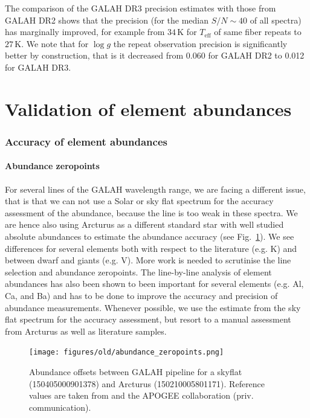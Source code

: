 \documentclass[fleqn,usenatbib,useAMS]{mnras}
\begin{document}
The comparison of the GALAH DR3 precision estimates with those from GALAH DR2 \citep{Buder2018} shows that the precision (for the median $S/N \sim 40$ of all spectra) has marginally improved, for example from $34\,\mathrm{K}$ for $T_\text{eff}$ of same fiber repeats to $27\,\mathrm{K}$. We note that for $\log g$ the repeat observation precision is significantly better by construction, that is it decreased from 0.060 for GALAH DR2 to 0.012 for GALAH DR3.

\section{Validation of element abundances} \label{sec:validation_ab}

\subsubsection{Accuracy of element abundances}

\paragraph*{Abundance zeropoints}

For several lines of the GALAH wavelength range, we are facing a different issue, that is that we can not use a Solar or sky flat spectrum for the accuracy assessment of the abundance, because the line is too weak in these spectra. We are hence also using Arcturus as a different standard star with well studied absolute abundances to estimate the abundance accuracy (see Fig.~\ref{fig:abundance_zeropoints}). We see differences for several elements both with respect to the literature (e.g. K) and between dwarf and giants (e.g. V). More work is needed to scrutinise the line selection and abundance zeropoints. The line-by-line analysis of element abundances has also been shown to been important for several elements (e.g. Al, Ca, and Ba) and has to be done to improve the accuracy and precision of abundance measurements. Whenever possible, we use the estimate from the sky flat spectrum for the accuracy assessment, but resort to a manual assessment from Arcturus as well as literature samples.

\begin{figure}
\centering
\texttt{[image: figures/old/abundance\_zeropoints.png]}
\caption[{Abundance offsets between the GALAH pipeline for a skyflat (150405000901378) and Arcturus (150210005801171).}]{Abundance offsets between GALAH pipeline for a skyflat (150405000901378) and Arcturus (150210005801171). Reference values are taken from \citet{Grevesse2007} and the APOGEE collaboration (priv. communication).}
\label{fig:abundance_zeropoints}
\end{figure}
\end{document}

